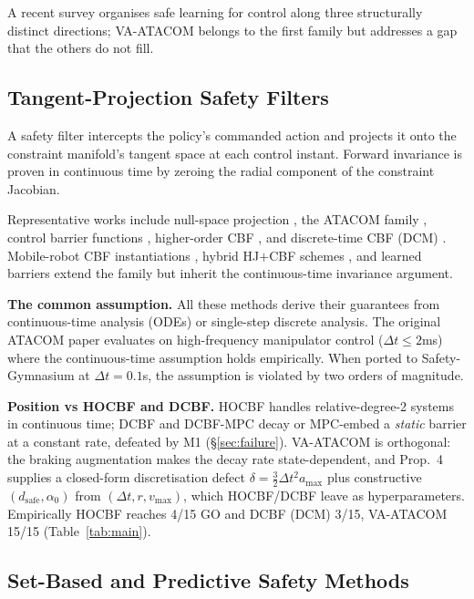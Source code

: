 \documentclass[letterpaper]{article}
\begin{document}
A recent survey \cite{brunke2022} organises safe learning for control along three structurally distinct directions; VA-ATACOM belongs to the first family but addresses a gap that the others do not fill.

\subsection{Tangent-Projection Safety Filters}

A safety filter intercepts the policy's commanded action and projects it onto the constraint manifold's tangent space at each control instant. Forward invariance is proven in continuous time by zeroing the radial component of the constraint Jacobian.

Representative works include null-space projection \cite{khatib1987,sentis2005}, the ATACOM family \cite{liu2022,liu2024,liu2025}, control barrier functions \cite{ames2014,ames2017}, higher-order CBF \cite{xiao2021}, and discrete-time CBF (DCM) \cite{agrawal2017}. Mobile-robot CBF instantiations \cite{cheng2019,taylor2020}, hybrid HJ$+$CBF schemes \cite{choi2020}, and learned barriers \cite{robey2020,lindemann2023} extend the family but inherit the continuous-time invariance argument.

\textbf{The common assumption.} All these methods derive their guarantees from continuous-time analysis (ODEs) or single-step discrete analysis. The original ATACOM paper evaluates on high-frequency manipulator control ($\Delta t \le 2$ms) where the continuous-time assumption holds empirically. When ported to Safety-Gymnasium at $\Delta t = 0.1$s, the assumption is violated by two orders of magnitude.

\textbf{Position vs HOCBF and DCBF.} HOCBF \cite{xiao2021} handles relative-degree-2 systems in continuous time; DCBF \cite{agrawal2017} and DCBF-MPC \cite{zeng2021} decay or MPC-embed a \emph{static} barrier at a constant rate, defeated by M1 (\S\ref{sec:failure}). VA-ATACOM is orthogonal: the braking augmentation makes the decay rate state-dependent, and Prop.~4 supplies a closed-form discretisation defect $\delta{=}\tfrac{3}{2}\Delta t^2 a_{\max}$ plus constructive $(d_\text{safe},\alpha_0)$ from $(\Delta t, r, v_{\max})$, which HOCBF/DCBF leave as hyperparameters. Empirically HOCBF reaches 4/15 GO and DCBF (DCM) 3/15, VA-ATACOM 15/15 (Table~\ref{tab:main}).

\subsection{Set-Based and Predictive Safety Methods}
\end{document}
